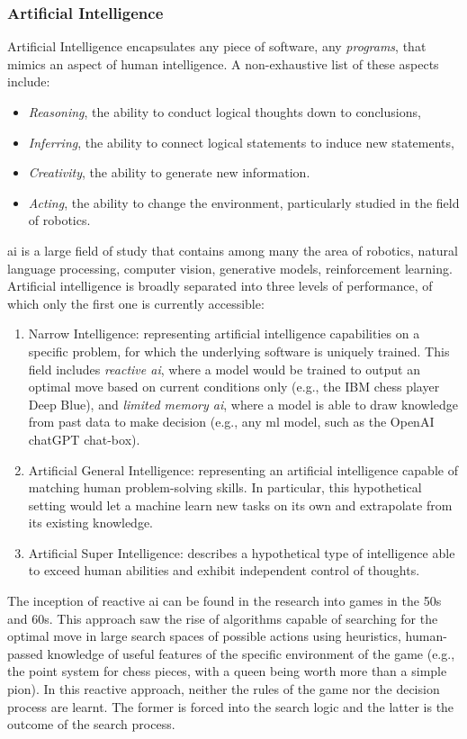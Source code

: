 \subsubsection{Artificial Intelligence}
Artificial Intelligence encapsulates any piece of software, any \textit{programs}, that mimics an aspect of human intelligence. A non-exhaustive list of these aspects include: 
\begin{itemize}
    \item \textit{Reasoning}, the ability to conduct logical thoughts down to conclusions, 
    \item \textit{Inferring}, the ability to connect logical statements to induce new statements,
    \item \textit{Creativity}, the ability to generate new information. 
    \item \textit{Acting}, the ability to change the environment, particularly studied in the field of robotics. 
\end{itemize}
\gls{ai} is a large field of study that contains among many the area of robotics, natural language processing, computer vision, generative models, reinforcement learning. Artificial intelligence is broadly separated into three levels of performance, of which only the first one is currently accessible: 
\begin{enumerate}
    \item Narrow Intelligence: representing artificial intelligence capabilities on a specific problem, for which the underlying software is uniquely trained. This field includes \textit{reactive \gls{ai}}, where a model would be trained to output an optimal move based on current conditions only (e.g., the IBM chess player Deep Blue), and \textit{limited memory \gls{ai}}, where a model is able to draw knowledge from past data to make decision (e.g., any \gls{ml} model, such as the OpenAI chatGPT chat-box).
    \item Artificial General Intelligence: representing an artificial intelligence capable of matching human problem-solving skills. In particular, this hypothetical setting would let a machine learn new tasks on its own and extrapolate from its existing knowledge. 
    \item Artificial Super Intelligence: describes a hypothetical type of intelligence able to exceed human abilities and exhibit independent control of thoughts. 
\end{enumerate}

The inception of reactive \gls{ai} can be found in the research into games in the 50s and 60s. This approach saw the rise of algorithms capable of searching for the optimal move in large search spaces of possible actions using heuristics, human-passed knowledge of useful features of the specific environment of the game (e.g., the point system for chess pieces, with a queen being worth more than a simple pion). In this reactive approach, neither the rules of the game nor the decision process are learnt. The former is forced into the search logic and the latter is the outcome of the search process.

